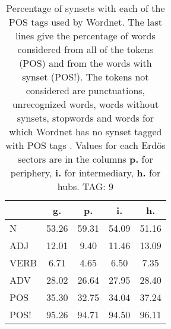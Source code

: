 \begin{table}[h!]
\begin{center}
\begin{tabular}{| l || c | c | c | c |}\hline
 & {\bf g.} & {\bf p.} & {\bf i.} & {\bf h.} \\\hline\hline
N & 53.26  & 59.31  & 54.09  & 51.16 \\\hline
ADJ & 12.01  & 9.40  & 11.46  & 13.09 \\\hline
VERB & 6.71  & 4.65  & 6.50  & 7.35 \\\hline
ADV & 28.02  & 26.64  & 27.95  & 28.40 \\\hline\hline
POS & 35.30  & 32.75  & 34.04  & 37.24 \\\hline
POS! & 95.26  & 94.71  & 94.50  & 96.11 \\\hline
\end{tabular}
\caption{Percentage of synsets with each of the POS tags used by Wordnet. The last lines give the percentage of words considered from all of the tokens (POS) and from the words with synset (POS!). The tokens not considered are punctuations, unrecognized words, words without synsets, stopwords and words for which Wordnet has no synset  tagged with POS tags . Values for each Erd\"os sectors are in the columns {{\bf p.}} for periphery, {{\bf i.}} for intermediary, {{\bf h.}} for hubs. TAG: 9}
\end{center}
\end{table}